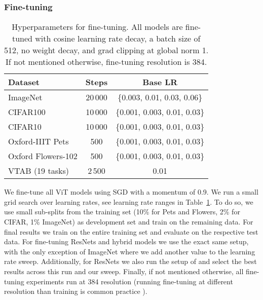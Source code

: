 \documentclass{article} \usepackage{iclr2021_conference,times}
\newcommand{\oursabbrv}{ViT\xspace}
\newcommand{\imagenet}{ImageNet\xspace}
\begin{document}
\subsubsection{Fine-tuning}\label{sec:finetuning}


\begin{table}[t]
\centering
\small
\begin{tabular}{l c c}
\toprule
Dataset            & Steps               & Base LR                      \\
\midrule
\imagenet           & 20\,000             & \{0.003, 0.01, 0.03, 0.06\}  \\
CIFAR100           & 10\,000             & \{0.001, 0.003, 0.01, 0.03\} \\
CIFAR10            & 10\,000             & \{0.001, 0.003, 0.01, 0.03\} \\
Oxford-IIIT Pets   & 500                 & \{0.001, 0.003, 0.01, 0.03\} \\
Oxford Flowers-102 & 500                 & \{0.001, 0.003, 0.01, 0.03\} \\
VTAB (19 tasks)    & 2\,500 & 0.01                                      \\
\bottomrule
\end{tabular}
\caption{Hyperparameters for fine-tuning. All models are fine-tuned with cosine learning rate decay, a batch size of 512, no weight decay, and grad clipping at global norm 1. If not mentioned otherwise, fine-tuning resolution is 384.}
\label{tbl:hparams-finetuning}
\end{table}


We fine-tune all \oursabbrv models using SGD with a momentum of 0.9.
We run a small grid search over learning rates, see learning rate ranges in Table~\ref{tbl:hparams-finetuning}. To do so, we use small sub-splits from the training set (10\% for Pets and Flowers, 2\% for CIFAR, 1\% \imagenet) as development set and train on the remaining data. For final results we train on the entire training set and evaluate on the respective test data.
For fine-tuning ResNets and hybrid models we use the exact same setup, with the only exception of \imagenet where we add another value  to the learning rate sweep.
Additionally, for ResNets we also run the setup of \citet{kolesnikov2020-bit} and select the best results across this run and our sweep.
Finally, if not mentioned otherwise, all fine-tuning experiments run at 384 resolution (running fine-tuning at different resolution than training is common practice \citep{kolesnikov2020-bit}).
\end{document}
